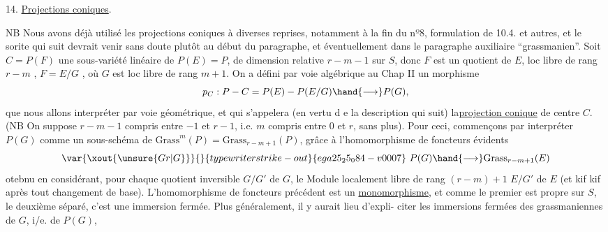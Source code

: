 
14. \uline{Projections coniques}.

NB Nous avons déjà utilisé les projections coniques à diverses
reprises, notamment à la fin du nº8, formulation de 10.4. et autres, et
le sorite qui suit devrait venir sans doute plutôt au début du paragraphe,
et éventuellement dans le paragraphe auxiliaire ``grassmanien''.
Soit $C = P(F)$ une sous-variété linéaire de $P(E)=P$, de dimension
relative $r-m-1$  sur $S$, donc $F$ est un quotient de $E$, loc libre de
rang $r-m$ , $F=E/G$ , où $G$ est loc libre de rang $m+1$. On a défini
par voie algébrique au Chap II un morphisme
\[ p_C : P - C = P(E) - P(E/G) \hand{\longrightarrow} P(G) , \]
que nous allons interpréter par voie géométrique, et qui s'appelera
(en vertu d e la description qui suit) la\uline{projection conique} de centre $C$.
(NB On suppose $r-m-1$ compris entre $-1$ et $r-1$, i.e. $m$ compris entre $0$
et $r$, sans plus). Pour ceci, commençons par interpréter  $P(G)$
comme un sous-schéma de $\mathrm{Grass}^m(P)= \mathrm{Grass}_{r-m+1}(P)$, grâce à l'homomorphisme
de foncteurs évidents
\[ \var{\xout{\unsure{Gr|G}}}{}{typewriter strike-out}{ega25_25_084-v0007}\ P(G) \hand{\longrightarrow} \mathrm{Grass}_{r-m+1}(E) \]
otebnu en considérant, pour chaque quotient inversible $G/G'$ de $G$, le
Module localement libre de rang $(r-m)+1$ $E/G'$ de $E$ (et kif kif après
tout changement de base). L'homomorphisme de foncteurs précédent est un
\uline{monomorphisme}, et comme le premier est propre sur $S$, le deuxième séparé,
c'est une immersion fermée. Plus généralement, il y aurait lieu d'expli-%
citer les immersions fermées des grassmaniennes de $G$, i/e. de $P(G)$,
